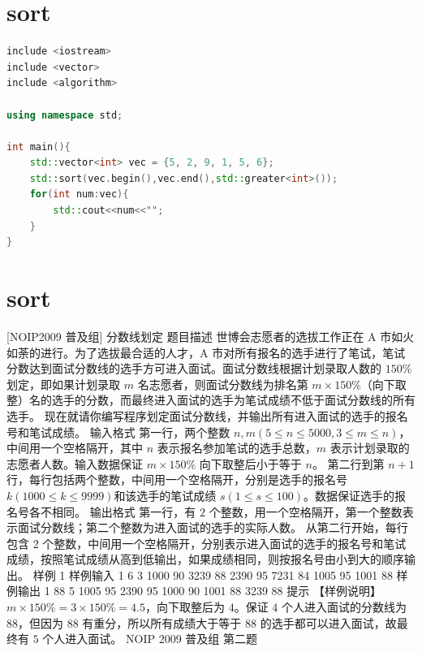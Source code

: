 \documentclass[12pt,twiside,a4paper]{ctexbook}
\numberwithin{chapter}{part}
\begin{document}
\section{sort}
\begin{lstlisting}[language=c++]
include <iostream>
include <vector>
include <algorithm>

using namespace std;

int main(){
    std::vector<int> vec = {5, 2, 9, 1, 5, 6};
    std::sort(vec.begin(),vec.end(),std::greater<int>());
    for(int num:vec){
	    std::cout<<num<<"";
    }
}
\end{lstlisting}

\section{sort}
 [NOIP2009 普及组] 分数线划定
 题目描述
世博会志愿者的选拔工作正在 A 市如火如荼的进行。为了选拔最合适的人才，A 市对所有报名的选手进行了笔试，笔试分数达到面试分数线的选手方可进入面试。面试分数线根据计划录取人数的 $150\%$ 划定，即如果计划录取 $m$ 名志愿者，则面试分数线为排名第 $m \times 150\%$（向下取整）名的选手的分数，而最终进入面试的选手为笔试成绩不低于面试分数线的所有选手。
现在就请你编写程序划定面试分数线，并输出所有进入面试的选手的报名号和笔试成绩。
 输入格式
第一行，两个整数 $n,m(5 \leq n \leq 5000,3 \leq m \leq n)$，中间用一个空格隔开，其中 $n$ 表示报名参加笔试的选手总数，$m$ 表示计划录取的志愿者人数。输入数据保证 $m \times 150\%$ 向下取整后小于等于 $n$。
第二行到第 $n+1$ 行，每行包括两个整数，中间用一个空格隔开，分别是选手的报名号 $k(1000 \leq k \leq 9999)$和该选手的笔试成绩 $s(1 \leq s \leq 100)$。数据保证选手的报名号各不相同。
 输出格式
第一行，有 $2$ 个整数，用一个空格隔开，第一个整数表示面试分数线；第二个整数为进入面试的选手的实际人数。
从第二行开始，每行包含 $2$ 个整数，中间用一个空格隔开，分别表示进入面试的选手的报名号和笔试成绩，按照笔试成绩从高到低输出，如果成绩相同，则按报名号由小到大的顺序输出。
 样例 1
 样例输入 1
6 3 
1000 90 
3239 88 
2390 95 
7231 84 
1005 95 
1001 88
 样例输出 1
88 5 
1005 95 
2390 95 
1000 90 
1001 88 
3239 88
 提示
【样例说明】
$m \times 150\% = 3 \times150\% = 4.5$，向下取整后为 $4$。保证 $4$ 个人进入面试的分数线为 $88$，但因为 $88$ 有重分，所以所有成绩大于等于 $88$ 的选手都可以进入面试，故最终有 $5$ 个人进入面试。
NOIP 2009 普及组 第二题
\end{document}
